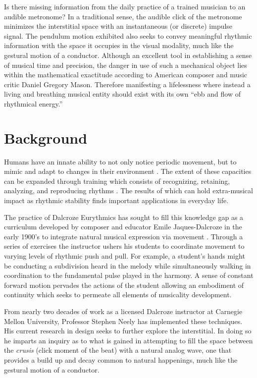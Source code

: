 Is there missing information from the daily practice of a trained musician to an audible metronome? In a traditional sense, the audible click of the metronome minimizes the interstitial space with an instantaneous (or discrete) impulse signal. The pendulum motion exhibited also seeks to convey meaningful rhythmic information with the space it occupies in the visual modality, much like the gestural motion of a conductor. Although an excellent tool in establishing a sense of musical time and precision, the danger in use of such a mechanical object lies within the mathematical exactitude according to American composer and music critic Daniel Gregory Mason. Therefore manifesting a lifelessness where instead a living and breathing musical entity should exist with its own ``ebb and flow of rhythmical energy.''\cite{fitts2008new}

\section{Background}
Humans have an innate ability to not only notice periodic movement, but to mimic and adapt to changes in their environment \cite{clayton2005time}. The extent of these capacities can be expanded through training which consists of recognizing, retaining, analyzing, and reproducing rhythms \cite{holland2010feeling}. The results of which can hold extra-musical impact as rhythmic stability finds important applications in everyday life.

The practice of Dalcroze Eurythmics has sought to fill this knowledge gap as a curriculum developed by composer and educator Emile Jaques-Dalcroze in the early 1900's to integrate natural musical expression via movement \cite{jaques1930eurhythmics}. Through a series of exercises the instructor ushers his students to coordinate movement to varying levels of rhythmic push and pull. For example, a student's hands might be conducting a subdivision heard in the melody while simultaneously walking in coordination to the fundamental pulse played in the harmony. A sense of constant forward motion pervades the actions of the student allowing an embodiment of continuity which seeks to permeate all elements of musicality development.

From nearly two decades of work as a licensed Dalcroze instructor at Carnegie Mellon University, Professor Stephen Neely has implemented these techniques. His current research in design seeks to further explore the interstitial. In doing so he imparts an inquiry as to what is gained in attempting to fill the space between the \textit{crusis} (click moment of the beat) with a natural analog wave, one that provides a build up and decay common to natural happenings, much like the gestural motion of a conductor.

